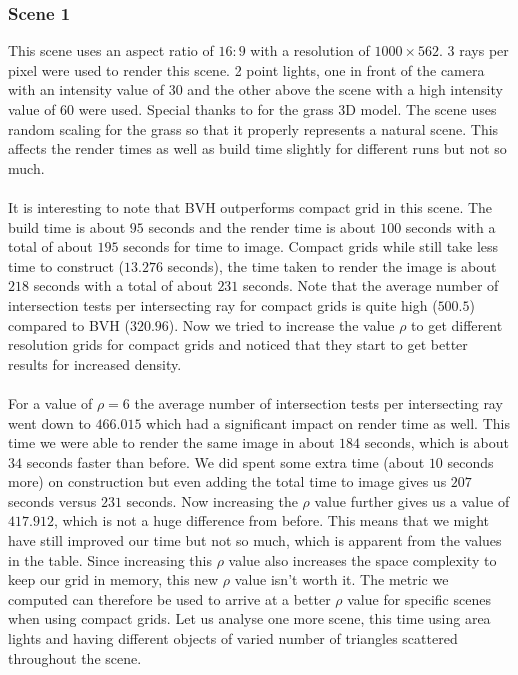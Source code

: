 \documentclass[11pt,a4paper]{article}
\begin{document}
\subsubsection{Scene 1}
This scene uses an aspect ratio of $16:9$ with a resolution of $1000 \times 562$. 3 rays per pixel were used to render this scene. 2 point lights, one in front of the camera with an intensity value of $30$ and the other above the scene with a high intensity value of $60$ were used. Special thanks to \cite{grass} for the grass 3D model. The scene uses random scaling for the grass so that it properly represents a natural scene. This affects the render times as well as build time slightly for different runs but not so much.
\\~\\
It is interesting to note that BVH outperforms compact grid in this scene. The build time is about $95$ seconds and the render time is about $100$ seconds with a total of about $195$ seconds for time to image. Compact grids while still take less time to construct ($13.276$ seconds), the time taken to render the image is about $218$ seconds with a total of about $231$ seconds. Note that the average number of intersection tests per intersecting ray for compact grids is quite high ($500.5$) compared to BVH ($320.96$). Now we tried to increase the value $\rho$ to get different resolution grids for compact grids and noticed that they start to get better results for increased density. 
\\~\\
For a value of $\rho=6$ the average number of intersection tests per intersecting ray went down to $466.015$ which had a significant impact on render time as well. This time we were able to render the same image in about $184$ seconds, which is about $34$ seconds faster than before. We did spent some extra time (about $10$ seconds more) on construction but even adding the total time to image gives us $207$ seconds versus $231$ seconds. Now increasing the $\rho$ value further gives us a value of $417.912$, which is not a huge difference from before. This means that we might have still improved our time but not so much, which is apparent from the values in the table. Since increasing this $\rho$ value also increases the space complexity to keep our grid in memory, this new $\rho$ value isn't worth it. The metric we computed can therefore be used to arrive at a better $\rho$ value for specific scenes when using compact grids. Let us analyse one more scene, this time using area lights and having different objects of varied number of triangles scattered throughout the scene.
\end{document}
